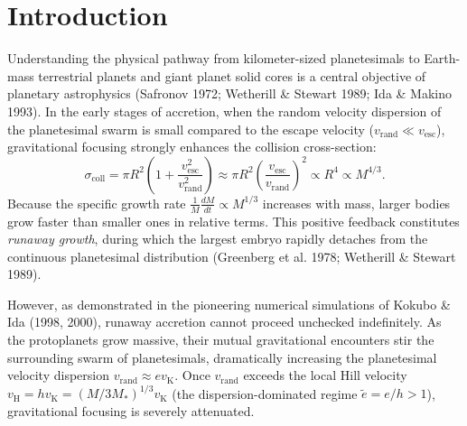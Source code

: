 \documentclass[11pt,a4paper]{article}
\begin{document}
\section{Introduction}
Understanding the physical pathway from kilometer-sized planetesimals to Earth-mass terrestrial planets and giant planet solid cores is a central objective of planetary astrophysics (Safronov 1972; Wetherill \& Stewart 1989; Ida \& Makino 1993). In the early stages of accretion, when the random velocity dispersion of the planetesimal swarm is small compared to the escape velocity ($v_{\text{rand}} \ll v_{\text{esc}}$), gravitational focusing strongly enhances the collision cross-section:
\begin{equation}
\sigma_{\text{coll}} = \pi R^2 \left( 1 + \frac{v_{\text{esc}}^2}{v_{\text{rand}}^2} \right) \approx \pi R^2 \left( \frac{v_{\text{esc}}}{v_{\text{rand}}} \right)^2 \propto R^4 \propto M^{4/3}.
\end{equation}
Because the specific growth rate $\frac{1}{M}\frac{dM}{dt} \propto M^{1/3}$ increases with mass, larger bodies grow faster than smaller ones in relative terms. This positive feedback constitutes \textit{runaway growth}, during which the largest embryo rapidly detaches from the continuous planetesimal distribution (Greenberg et al. 1978; Wetherill \& Stewart 1989).

However, as demonstrated in the pioneering numerical simulations of Kokubo \& Ida (1998, 2000), runaway accretion cannot proceed unchecked indefinitely. As the protoplanets grow massive, their mutual gravitational encounters stir the surrounding swarm of planetesimals, dramatically increasing the planetesimal velocity dispersion $v_{\text{rand}} \approx e v_{\text{K}}$. Once $v_{\text{rand}}$ exceeds the local Hill velocity $v_{\text{H}} = h v_{\text{K}} = (M/3M_*)^{1/3} v_{\text{K}}$ (the dispersion-dominated regime $\tilde{e} = e/h > 1$), gravitational focusing is severely attenuated.
\end{document}
